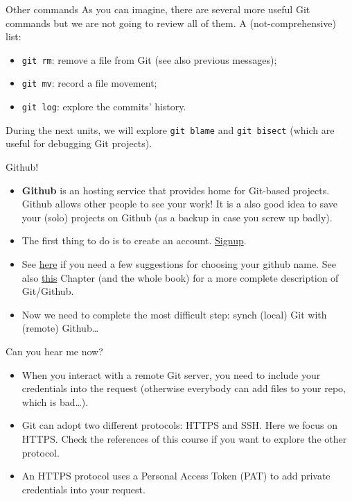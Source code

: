 \documentclass[
hyperref={bookmarks=false},
xcolor={dvipsnames,svgnames*,x11names*}, 
12pt
]{beamer}
\begin{document}
\begin{frame}{Other commands}
\vspace{-0.5cm}
As you can imagine, there are several more useful Git commands but we are not going to review all of them. A (not-comprehensive) list: 
\begin{itemize}
\itemsep 2ex
\item \texttt{git rm}: remove a file from Git (see also previous messages); 
\item \texttt{git mv}: record a file movement; 
\item \texttt{git log}: explore the commits' history.
\end{itemize}
During the next units, we will explore \texttt{git blame} and \texttt{git bisect} (which are useful for debugging Git projects). 
\end{frame}

\begin{frame}{Github!}
\vspace{-0.5cm}
\begin{itemize}
\itemsep 2ex
\item \textbf{Github} is an hosting service that provides home for Git-based projects. Github allows other people to see your work! It is a also good idea to save your (solo) projects on Github (as a backup in case you screw up badly). 
\item The first thing to do is to create an account. \href{https://github.com/signup?ref_cta=Sign+up\&ref_loc=header+logged+out\&ref_page=\%2F\&source=header-home}{Signup}. 
\item See \href{https://happygitwithr.com/github-acct.html}{here} if you need a few suggestions for choosing your github name. See also \href{https://happygitwithr.com/big-picture.html}{this} Chapter (and the whole book) for a more complete description of Git/Github.  
\item Now we need to complete the most difficult step: synch (local) Git with (remote) Github\dots
\end{itemize}
\end{frame}

\begin{frame}{Can you hear me now?}
\vspace{-0.5cm}
\begin{itemize}
\itemsep 2ex
\item When you interact with a remote Git server, you need to include your credentials into the request (otherwise everybody can add files to your repo, which is bad\dots). 
\item Git can adopt two different protocols: HTTPS and SSH. Here we focus on HTTPS. Check the references of this course if you want to explore the other protocol. 
\item An HTTPS protocol uses a Personal Access Token (PAT) to add private credentials into your request. 
\end{itemize}
\end{frame}
\end{document}
